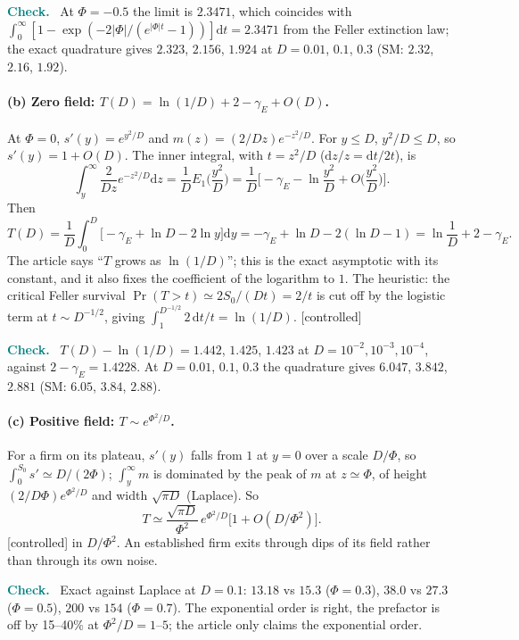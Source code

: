 \documentclass[11pt]{article}
\newcommand{\dd}{\mathrm d}
\newcommand{\controlled}{\textsf{\small[controlled]}}
\newenvironment{verify}{\par\medskip\noindent\textcolor{teal}{\textbf{Check.}}\ }{\par\medskip}
\begin{document}
\begin{verify}
At $\Phi=-0.5$ the limit is $2.3471$, which coincides with $\int_0^\infty[1-\exp(-2|\Phi|/(e^{|\Phi|t}-1))]\dd t=2.3471$ from the
Feller extinction law; the exact quadrature gives $2.323$, $2.156$, $1.924$ at $D=0.01$, $0.1$, $0.3$ (SM: $2.32$, $2.16$, $1.92$).
\end{verify}

\paragraph{(b) Zero field: $T(D)=\ln(1/D)+2-\gamma_E+O(D)$.}  At $\Phi=0$, $s'(y)=e^{y^2/D}$ and
$m(z)=(2/Dz)e^{-z^2/D}$.  For $y\le D$, $y^2/D\le D$, so $s'(y)=1+O(D)$.  The inner integral, with $t=z^2/D$
($\dd z/z=\dd t/2t$), is
\begin{equation}
\int_y^\infty\frac{2}{Dz}e^{-z^2/D}\dd z=\frac1DE_1\Big(\frac{y^2}{D}\Big)=\frac1D\Big[-\gamma_E-\ln\frac{y^2}{D}+O\Big(\frac{y^2}D\Big)\Big].
\end{equation}
Then
\begin{equation}
T(D)=\frac1D\int_0^D\Big[-\gamma_E+\ln D-2\ln y\Big]\dd y=-\gamma_E+\ln D-2(\ln D-1)=\ln\frac1D+2-\gamma_E .
\end{equation}
The article says ``$T$ grows as $\ln(1/D)$''; this is the exact asymptotic with its constant, and it also fixes the
coefficient of the logarithm to $1$.  The heuristic: the critical Feller survival $\Pr(T>t)\simeq2S_0/(Dt)=2/t$ is cut off by the
logistic term at $t\sim D^{-1/2}$, giving $\int_1^{D^{-1/2}}2\,\dd t/t=\ln(1/D)$.  \controlled

\begin{verify}
$T(D)-\ln(1/D)=1.442$, $1.425$, $1.423$ at $D=10^{-2},10^{-3},10^{-4}$, against $2-\gamma_E=1.4228$.  At $D=0.01$, $0.1$, $0.3$ the
quadrature gives $6.047$, $3.842$, $2.881$ (SM: $6.05$, $3.84$, $2.88$).
\end{verify}

\paragraph{(c) Positive field: $T\sim e^{\Phi^2/D}$.}  For a firm on its plateau, $s'(y)$ falls from $1$ at $y=0$ over a scale $D/\Phi$,
so $\int_0^{S_0}s'\simeq D/(2\Phi)$; $\int_y^\infty m$ is dominated by the peak of $m$ at $z\simeq\Phi$, of height
$(2/D\Phi)e^{\Phi^2/D}$ and width $\sqrt{\pi D}$ (Laplace).  So
\begin{equation}
T\simeq\frac{\sqrt{\pi D}}{\Phi^2}\,e^{\Phi^2/D}\big[1+O(D/\Phi^2)\big].
\end{equation}
\controlled{} in $D/\Phi^2$.  An established firm exits through dips of its field rather than through its own noise.
\begin{verify}
Exact against Laplace at $D=0.1$: $13.18$ vs $15.3$ ($\Phi=0.3$), $38.0$ vs $27.3$ ($\Phi=0.5$), $200$ vs $154$ ($\Phi=0.7$).  The exponential
order is right, the prefactor is off by 15--40\% at $\Phi^2/D=1$--$5$; the article only claims the exponential order.
\end{verify}
\end{document}
